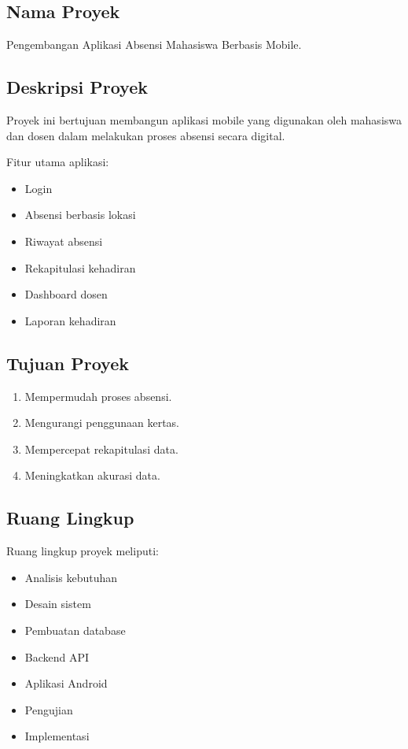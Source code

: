 \documentclass[12pt,a4paper]{article}
\begin{document}
\subsection{Nama Proyek}

Pengembangan Aplikasi Absensi Mahasiswa Berbasis Mobile.


\subsection{Deskripsi Proyek}

Proyek ini bertujuan membangun aplikasi mobile yang digunakan oleh mahasiswa dan dosen dalam melakukan proses absensi secara digital.

Fitur utama aplikasi:

\begin{itemize}
\item Login
\item Absensi berbasis lokasi
\item Riwayat absensi
\item Rekapitulasi kehadiran
\item Dashboard dosen
\item Laporan kehadiran
\end{itemize}


\subsection{Tujuan Proyek}

\begin{enumerate}
\item Mempermudah proses absensi.
\item Mengurangi penggunaan kertas.
\item Mempercepat rekapitulasi data.
\item Meningkatkan akurasi data.
\end{enumerate}


\subsection{Ruang Lingkup}

Ruang lingkup proyek meliputi:

\begin{itemize}
\item Analisis kebutuhan
\item Desain sistem
\item Pembuatan database
\item Backend API
\item Aplikasi Android
\item Pengujian
\item Implementasi
\end{itemize}
\end{document}
